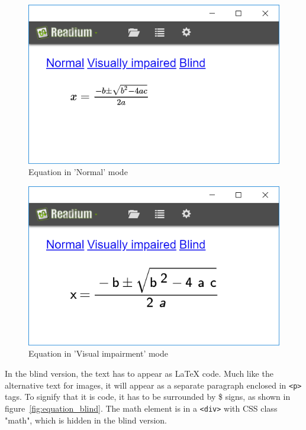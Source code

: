 \begin{figure}[H]
	\centering
	\includegraphics[width=\linewidth*2/3]{figures/EquationNo.PNG}
	\caption{Equation in 'Normal' mode}
	\label{fig:equation_normal}
\end{figure}

\begin{figure}[H]
	\centering
	\includegraphics[width=\linewidth*2/3]{figures/EquationVi.PNG}
	\caption{Equation in 'Visual impairment' mode}
	\label{fig:equation_viimp}
\end{figure}


In the blind version, the text has to appear as LaTeX code. Much like the alternative text for images, it will appear as a separate paragraph enclosed in \lstinline{<p>}  tags. To signify that it is code, it has to be surrounded by \$ signs, as shown in figure~\ref{fig:equation_blind}. The math element is in a \lstinline{<div>} with CSS class "math", which is hidden in the blind version.

